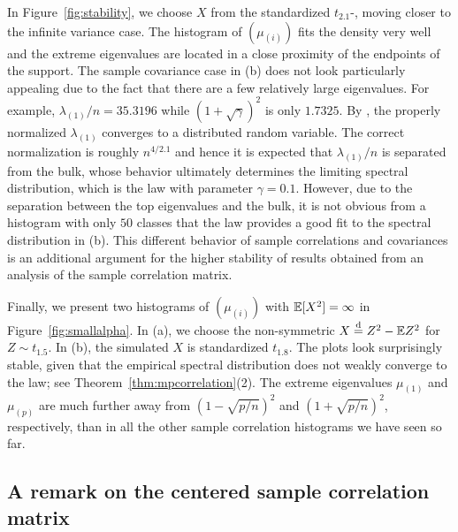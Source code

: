 In Figure~\ref{fig:stability}, we choose $X$ from the standardized
$t_{2.1}$-\ds , moving closer to the infinite variance case. The histogram of $(\mu_{(i)})$ fits the \MP density very well and the extreme eigenvalues are located in a close proximity of the endpoints of the \MP support. The sample covariance case in (b) does not 
look particularly appealing due to the fact that there are a few relatively large eigenvalues. For example, $\lambda_{(1)}/n=35.3196$ while $(1+\sqrt{\gamma})^2$ is only $1.7325$. By \cite{auffinger:arous:peche:2009,heiny:mikosch:2015:iid,davis:mikosch:heiny:xie:2015}, the properly normalized $\lambda_{(1)}$ converges to a \Frechet distributed random variable. The correct normalization is roughly $n^{4/2.1}$ and hence it is expected that $\lambda_{(1)}/n$ is separated from the bulk, whose behavior ultimately determines the limiting spectral distribution, which is the \MP law with parameter $\gamma=0.1$. However, due to the separation between the top eigenvalues and the bulk, it is not obvious from a histogram with only $50$ classes that the \MP law provides a good fit to the spectral distribution in (b). This different behavior of sample correlations and covariances is an additional argument for the higher stability of results obtained from an analysis of the sample correlation matrix.  
\par

Finally, we present two histograms of $(\mu_{(i)})$ with $\mathbb{E}[X^2]=\infty$ in Figure~\ref{fig:smallalpha}. 
In (a), we choose the non-symmetric $X \stackrel{\rm d}{=} Z^2-\mathbb{E} Z^2$ for $Z\sim t_{1.5}$. 
In (b), the simulated $X$ is standardized $t_{1.8}$. 
The plots look surprisingly stable, given that the empirical spectral distribution 
does not weakly converge to the \MP law; see Theorem~\ref{thm:mpcorrelation}(2). 
The extreme eigenvalues $\mu_{(1)}$ and $\mu_{(p)}$ are much further away from $(1-\sqrt{p/n})^2$ and $(1+\sqrt{p/n})^2$, respectively, than in all the other sample correlation histograms we have seen so far. 





\subsection{A remark on the centered sample correlation matrix}

